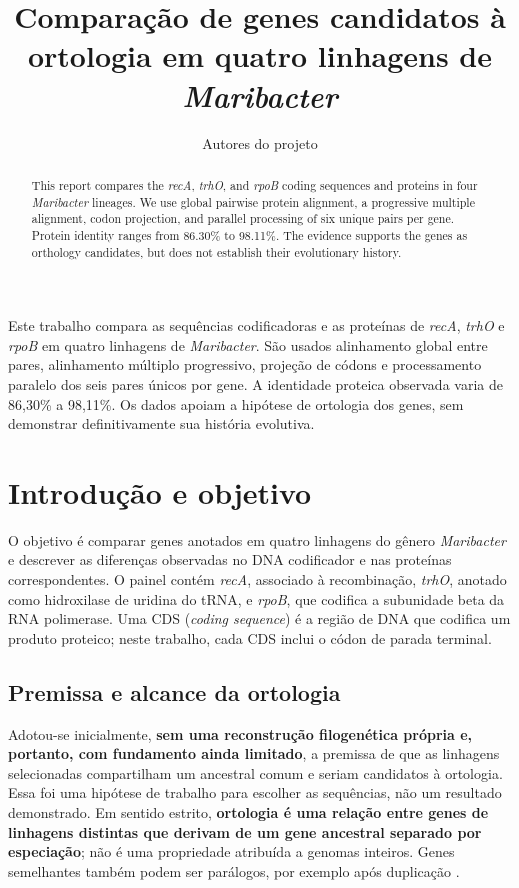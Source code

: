 \documentclass[12pt]{article}
\title{Comparação de genes candidatos à ortologia em quatro linhagens de \textit{Maribacter}}
\author{Autores do projeto\inst{1}}
\begin{document}
\maketitle

\begin{abstract}
  This report compares the \textit{recA}, \textit{trhO}, and \textit{rpoB} coding
  sequences and proteins in four \textit{Maribacter} lineages. We use global
  pairwise protein alignment, a progressive multiple alignment, codon
  projection, and parallel processing of six unique pairs per gene. Protein
  identity ranges from 86.30\% to 98.11\%. The evidence supports the genes as
  orthology candidates, but does not establish their evolutionary history.
\end{abstract}

\begin{resumo}
  Este trabalho compara as sequências codificadoras e as proteínas de
  \textit{recA}, \textit{trhO} e \textit{rpoB} em quatro linhagens de
  \textit{Maribacter}. São usados alinhamento global entre pares, alinhamento
  múltiplo progressivo, projeção de códons e processamento paralelo dos seis
  pares únicos por gene. A identidade proteica observada varia de 86,30\% a
  98,11\%. Os dados apoiam a hipótese de ortologia dos genes, sem demonstrar
  definitivamente sua história evolutiva.
\end{resumo}

\section{Introdução e objetivo}

O objetivo é comparar genes anotados em quatro linhagens do gênero
\textit{Maribacter} e descrever as diferenças observadas no DNA codificador e
nas proteínas correspondentes. O painel contém \textit{recA}, associado à
recombinação, \textit{trhO}, anotado como hidroxilase de uridina do tRNA, e
\textit{rpoB}, que codifica a subunidade beta da RNA polimerase. Uma CDS
(\textit{coding sequence}) é a região de DNA que codifica um produto proteico;
neste trabalho, cada CDS inclui o códon de parada terminal.

\subsection{Premissa e alcance da ortologia}

Adotou-se inicialmente, \textbf{sem uma reconstrução filogenética própria e,
portanto, com fundamento ainda limitado}, a premissa de que as linhagens
selecionadas compartilham um ancestral comum e seriam candidatos à ortologia. Essa foi uma hipótese de trabalho para escolher as sequências, não um resultado demonstrado. Em sentido estrito, \textbf{ortologia é uma relação entre genes de linhagens distintas que derivam
de um gene ancestral separado por especiação}; não é uma propriedade atribuída
a genomas inteiros. Genes semelhantes também podem ser parálogos, por exemplo
após duplicação \cite{tatusov1997,ncbiorthology}.
\end{document}
